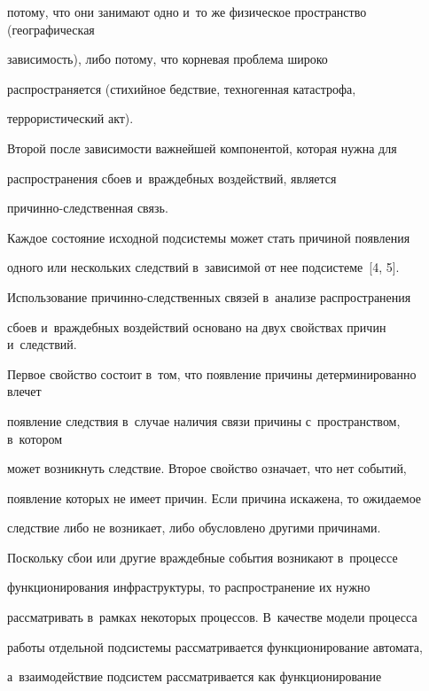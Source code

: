 потому, что они занимают одно и~то же физическое пространство (географическая  


за\-ви\-си\-мость), либо потому, что корневая проб\-ле\-ма широко 


распространяется (стихийное бедствие, техногенная катастрофа, 


террористический акт).


  


  Второй после зависимости важнейшей компонентой, которая нуж\-на для 


распространения сбоев и~враж\-деб\-ных воздействий, является  


при\-чин\-но-след\-ст\-вен\-ная связь.


  


  Каждое состояние исходной под\-сис\-те\-мы может стать причиной появления 


одного или нескольких следствий в~зависимой от нее под\-сис\-те\-ме~[4, 5]. 


Использование при\-чин\-но-след\-ст\-вен\-ных связей в~анализе распространения 


сбоев и~враж\-деб\-ных воздействий основано на двух свойствах причин и~следствий. 


Первое свойство со\-сто\-ит в~том, что появление причины детерминированно влечет 


появление следствия в~случае наличия связи причины с~пространством, в~котором 


может возникнуть следствие. Второе свойство означает, что нет событий, 


появление которых не имеет причин. Если причина искажена, то ожи\-да\-емое 


следствие либо не возникает, либо обуслов\-ле\-но другими причинами.


  


  Поскольку сбои или другие враждебные события возникают в~процессе 


функционирования инфраструктуры, то распространение их нуж\-но  


рас\-смат\-ри\-вать в~рамках некоторых процессов. В~качестве модели процесса 


работы отдельной под\-сис\-те\-мы рас\-смат\-ри\-ва\-ет\-ся функционирование автомата, 


а~взаимодействие под\-сис\-тем рас\-смат\-ри\-ва\-ет\-ся как функционирование 


